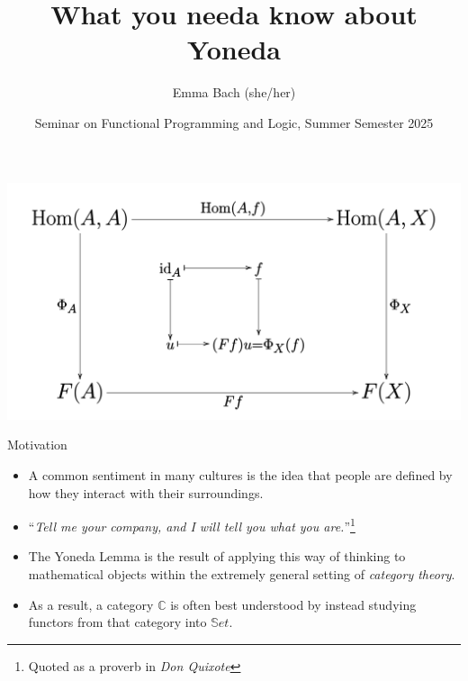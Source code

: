 \documentclass[aspectratio=169]{beamer} %
\title{What you needa know about Yoneda}
\author{Emma Bach (she/her)}
\date{Seminar on Functional Programming and Logic, Summer Semester 2025}
\newcommand{\bC}{\mathbb{C}}
\begin{document}
{

\begin{frame}[plain]
    \includegraphics[width=0.4\paperwidth]{figures/Yoneda_lemma_cd.svg.png}
    \titlepage
\end{frame}

\begin{frame}{Motivation}
 \begin{itemize}
  \item A common sentiment in many cultures is the idea that people are defined by how they interact with their surroundings.
  \pause\item ``\textit{Tell me your company, and I will tell you what you are.}''\footnote{Quoted as a proverb in \textit{Don Quixote}}
  \pause\item The Yoneda Lemma is the result of applying this way of thinking to mathematical objects within the extremely general setting of \textit{category theory}.
  \pause\item As a result, a category $\bC$ is often best understood by instead studying functors from that category into $\mathbb{S}et$.
 \end{itemize}
\end{frame}

}
\end{document}
